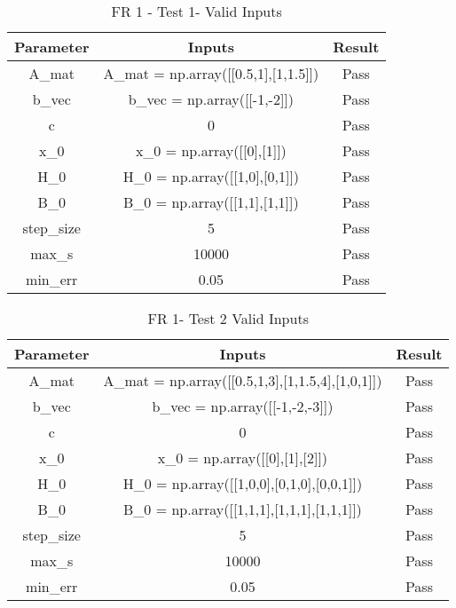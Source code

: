 \documentclass[12pt, titlepage]{article}
\begin{document}
\begin{table}[ht]
\caption{FR 1 - Test 1- Valid Inputs} \label{tbl_FR1T1}
\vspace*{2mm}
\centering
 \begin{tabular}{|c|c|c|} 
 \hline
\textbf{Parameter} & \textbf{Inputs} & \textbf{Result} \\ 
\hline
A\_mat&  A\_mat = np.array([[0.5,1],[1,1.5]])  &Pass \\
 \hline
 b\_vec& b\_vec = np.array([[-1,-2]]) & Pass \\ 
 \hline
 c& 0 & Pass \\ 
 \hline
 x\_0& x\_0 = np.array([[0],[1]]) & Pass\\ 
 \hline
 H\_0& H\_0 = np.array([[1,0],[0,1]]) & Pass \\ 
 \hline
 B\_0& B\_0 = np.array([[1,1],[1,1]]) & Pass \\ 
 \hline
 step\_size& 5 & Pass \\ 
 \hline
 max\_s& 10000 & Pass \\ 
 \hline
 min\_err& 0.05 & Pass \\ 
 \hline
 
\end{tabular}
\end{table}

\begin{table}[ht]
\caption{FR 1- Test 2 Valid Inputs} \label{tbl_FR1T2}
\vspace*{2mm}
\centering
 \begin{tabular}{|c|c|c|} 
 \hline
\textbf{Parameter} & \textbf{Inputs} & \textbf{Result} \\ 
\hline
A\_mat&  A\_mat = np.array([[0.5,1,3],[1,1.5,4],[1,0,1]])  &Pass \\
 \hline
 b\_vec& b\_vec = np.array([[-1,-2,-3]]) & Pass \\ 
 \hline
 c& 0 & Pass \\ 
 \hline
 x\_0& x\_0 = np.array([[0],[1],[2]]) & Pass\\ 
 \hline
 H\_0& H\_0 = np.array([[1,0,0],[0,1,0],[0,0,1]]) & Pass \\ 
 \hline
 B\_0& B\_0 = np.array([[1,1,1],[1,1,1],[1,1,1]]) & Pass \\ 
 \hline
 step\_size& 5 & Pass \\ 
 \hline
 max\_s& 10000 & Pass \\ 
 \hline
 min\_err& 0.05 & Pass \\ 
 \hline
 
\end{tabular}
\end{table}
\end{document}
